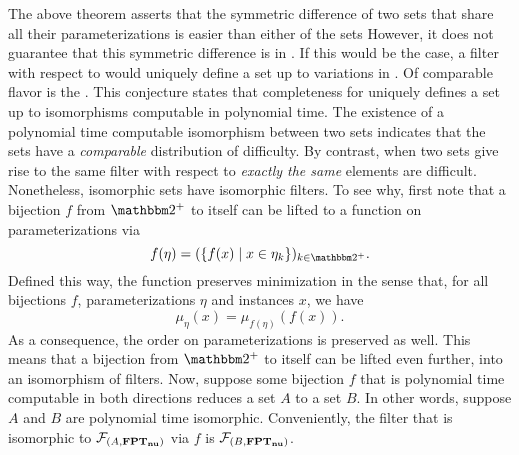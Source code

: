 The above theorem asserts that the symmetric difference of two sets that share all their parameterizations is easier than either of the sets
However, it does not guarantee that this symmetric difference is in .
If this would be the case, a filter with respect to  would uniquely define a set up to variations in .
Of comparable flavor is the  \parencite{berman1977isomorphisms,young1983some}.
This conjecture states that completeness for  uniquely defines a set up to isomorphisms computable in polynomial time.
The existence of a polynomial time computable isomorphism between two sets indicates that the sets have a \emph{comparable} distribution of difficulty.
By contrast, when two sets give rise to the same filter with respect to  \emph{exactly the same} elements are difficult.
Nonetheless, isomorphic sets have isomorphic filters.
To see why, first note that a bijection $f$ from $\binary^+$ to itself can be lifted to a function on parameterizations via
\begin{equation*}
  f(\eta) = (\{f(x) \st x \in \eta_k\})_{k \in \binary^+}.
\end{equation*}
Defined this way, the function preserves minimization in the sense that, for all bijections $f$, parameterizations $\eta$ and instances $x$, we have
\begin{equation*}
  \mu_\eta(x) = \mu_{f(\eta)}(f(x)).
\end{equation*}
As a consequence, the order on parameterizations is preserved as well.
This means that a bijection from $\binary^+$ to itself can be lifted even further, into an isomorphism of filters.
Now, suppose some bijection $f$ that is polynomial time computable in both directions reduces a set $A$ to a set $B$.
In other words, suppose $A$ and $B$ are polynomial time isomorphic.
Conveniently, the filter that is isomorphic to $\mathcal{F}_{(A, \textnormal{\textbf{FPT$_\textbf{nu}$}})}$ via $f$ is $\mathcal{F}_{(B, \textnormal{\textbf{FPT$_\textbf{nu}$}})}$.


